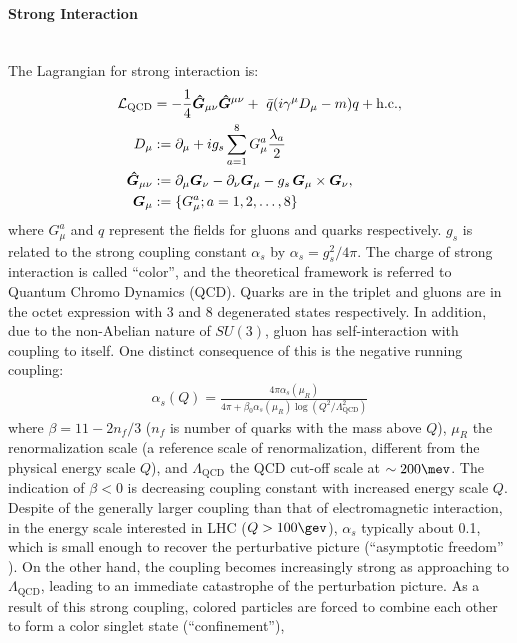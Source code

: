 \paragraph{Strong Interaction}  \mbox{} \\
The Lagrangian for strong interaction is:
\begin{align}
\mathcal{L}_{\mathrm{QCD}} & = -\frac{1}{4} \bm{\hat{G}}_{\mu\nu} \bm{\hat{G}}^{\mu\nu} + \,\, \bar{q}(i \gamma^\mu D_\mu - m) q + \mathrm{h.c.}, \nonumber \\
D_\mu & := \partial_\mu + ig_s \sum_{a=1}^8 G^a_{\mu}\frac{\lambda_a}{2} \nonumber \\
\bm{\hat{G}}_{\mu\nu} & := \partial_\mu \bm{G}_\nu - \partial_\nu \bm{G}_\mu - g_s \, \bm{G}_\mu \times \bm{G}_\nu, \nonumber \\
\bm{G}_\mu & := \{G^a_\mu; a=1,2,\dots,8\}
\label{eq::QCDLag}
\end{align}
where $G^a_\mu$ and $q$ represent the fields for gluons and quarks respectively.
$g_s$ is related to the strong coupling constant $\alpha_s$ by $\alpha_s = g_s^2/4\pi$. 
The charge of strong interaction is called ``color'', and the theoretical framework is referred to Quantum Chromo Dynamics (QCD). 
Quarks are in the triplet and gluons are in the octet expression with 3 and 8 degenerated states respectively.
In addition, due to the non-Abelian nature of $SU(3)$, gluon has self-interaction with coupling to itself. One distinct consequence of this is the negative running coupling:
\begin{align}
\alpha_s(Q) = \frac{4\pi\alpha_s(\mu_R)}{4\pi + \beta_0 \alpha_s(\mu_R)\log{(Q^2/\Lambda^2_{\mathrm{QCD}})} }
\end{align}
where $\beta = 11 -2n_f/3$ ($n_f$ is number of quarks with the mass above $Q$), $\mu_R$ the renormalization scale (a reference scale of renormalization, different from the physical energy scale $Q$), and $\Lambda_{\mathrm{QCD}}$ the QCD cut-off scale at $\sim 200\mev$. The indication of $\beta<0$ is decreasing coupling constant with increased energy scale $Q$.
Despite of the generally larger coupling than that of electromagnetic interaction, in the energy scale interested in LHC ($Q>100\gev$), $\alpha_s$ typically about 0.1, which is small enough to recover the perturbative picture (``asymptotic freedom'' 
). 
On the other hand, the coupling becomes increasingly strong as approaching to $\Lambda_{\mathrm{QCD}}$, leading to an immediate catastrophe of the perturbation picture. 
As a result of this strong coupling, colored particles are forced to combine each other to form a color singlet state (``confinement''),


